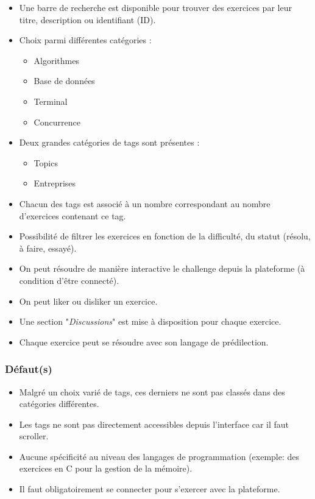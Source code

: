 \begin{itemize}
    \item Une barre de recherche est disponible pour trouver des exercices par leur titre, description ou identifiant (ID).
    \item Choix parmi différentes catégories :
    \begin{itemize}
        \item Algorithmes
        \item Base de données
        \item Terminal
        \item Concurrence
    \end{itemize}
    \item Deux grandes catégories de \glspl{tag} sont présentes :
    \begin{itemize}
        \item Topics
        \item Entreprises
    \end{itemize}
    \item Chacun des \glspl{tag} est associé à un nombre correspondant au nombre d'exercices contenant ce \gls{tag}.
    \item Possibilité de filtrer les exercices en fonction de la difficulté, du statut (résolu, à faire, essayé).
    \item On peut résoudre de manière interactive le challenge depuis la plateforme (à condition d'être connecté).
    \item On peut liker ou disliker un exercice.
    \item Une section "\textit{Discussions}" est mise à disposition pour chaque exercice.
    \item Chaque exercice peut se résoudre avec son langage de prédilection.
\end{itemize}

\subsubsection*{Défaut(s)}

\begin{itemize}
    \item Malgré un choix varié de \glspl{tag}, ces derniers ne sont pas classés dans des catégories différentes.
    \item Les \glspl{tag} ne sont pas directement accessibles depuis l'interface car il faut scroller.
    \item Aucune spécificité au niveau des langages de programmation (exemple: des exercices en C pour la gestion de la mémoire).
    \item Il faut obligatoirement se connecter pour s'exercer avec la plateforme.
\end{itemize}

